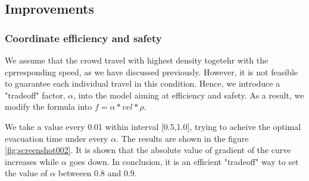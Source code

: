 \documentclass{mcmthesis}
\begin{document}
\subsection{Improvements}

 \subsubsection{Coordinate efficiency and safety}
We assume that the crowd travel with highest density togetehr with the cprresponding speed, as we have discussed previously. However, it is not feasible to guarantee each individual travel in this condition. Hence, we introduce a "tradeoff" factor, $\alpha$, into the model aiming at efficiency and safety. As a result, we modify the formula into
$f=\alpha * vel * \rho$. 

We take a value every 0.01 within interval [0.5,1.0], trying to acheive the optimal evacuation time under every $\alpha$. The results are shown in the figure \ref{fig:screenshot002}. It is shown that the absolute value of gradient of the curve increases while $\alpha$ goes down. In conclusion, it is an efficient "tradeoff" way to set the value of $\alpha$ betweeen 0.8 and 0.9.

\begin{figure} 
	\centering 
	\hspace{0.2in} 
\end{figure}
\end{document}
